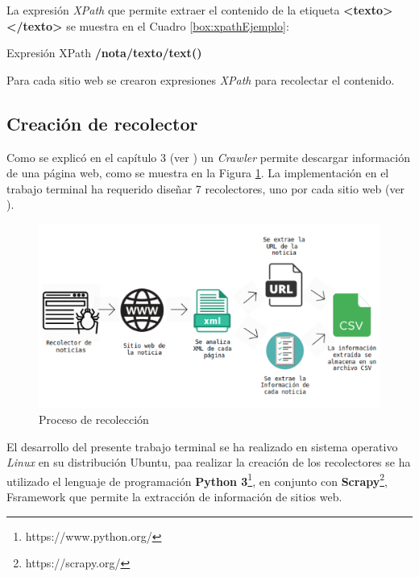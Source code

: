 La expresión \textit{XPath} que permite extraer el contenido de la etiqueta \textbf{<texto> </texto>} se muestra en el Cuadro \ref{box:xpathEjemplo}: \\

\begin{mygraybox}[label={box:xpathEjemplo}]{Expresión XPath} 
\textbf{/nota/texto/text()}
\end{mygraybox}

Para cada sitio web se crearon expresiones \textit{XPath} para recolectar el contenido.

\subsection{Creación de recolector}

Como se explicó en el capítulo 3 (ver ) un \textit{Crawler} permite descargar información de una página web, como se muestra en la Figura \ref{Fig:recoleccion}. La implementación en el trabajo terminal ha requerido diseñar 7 recolectores, uno por cada sitio web (ver ). \\

\begin{figure}[H]
	\centering
	\includegraphics[scale=.2]{imagenes/Capitulo5/recoleccion.png}
	\caption{Proceso de recolección}
	\label{Fig:recoleccion}
\end{figure}

El desarrollo del presente trabajo terminal se ha realizado en sistema operativo \textit{Linux} en su distribución Ubuntu, paa realizar la creación de los recolectores se ha utilizado el lenguaje de programación \textbf{Python 3}\footnote{https://www.python.org/}, en conjunto con \textbf{Scrapy}\footnote{https://scrapy.org/}, Fsramework que permite la extracción de información de sitios web. 

